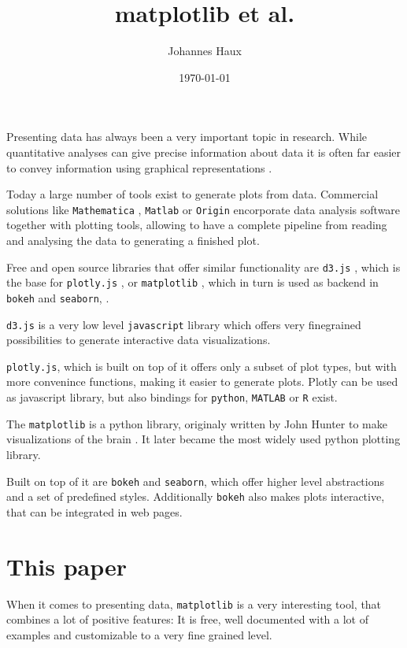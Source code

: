 \documentclass[a4paper, 11pt, onecolumn]{article}
\title{matplotlib et al.}
\author{Johannes Haux}
\date{\today}
\newcommand{\mpl}{\texttt{matplotlib}\xspace}
\newcommand{\pl}[1]{\mbox{\texttt{#1}\xspace}}
\begin{document}
\maketitle


Presenting data has always been a very important topic in research. 
While quantitative analyses can give precise information about data it is
often far easier to convey information using graphical representations 
\cite{plotsarecool}.

Today a large number of tools exist to generate plots from data.  Commercial
solutions like \pl{Mathematica} \cite{mate}, \pl{Matlab} \cite{matl} or
\pl{Origin} \cite{orig} encorporate data analysis software together with
plotting tools, allowing to have a complete pipeline from reading and analysing
the data to generating a finished plot.

Free and open source libraries that offer similar functionality are \pl{d3.js}
\cite{d3js}, which is the base for \pl{plotly.js} \cite{plotly}, or \mpl
\cite{mpl}, which in turn is used as backend in \pl{bokeh} \cite{bokeh} and
\pl{seaborn}, \cite{seaborn}.

\pl{d3.js} is a very low level \pl{javascript} library which offers very
finegrained possibilities to generate interactive data visualizations.

\pl{plotly.js}, which is built on top of it offers only a subset of plot types,
but with more convenince functions, making it easier to generate plots. 
Plotly can be used as javascript library, but also bindings for \pl{python}, 
\pl{MATLAB} or \pl{R} exist.

The \mpl is a python library, originaly written by John Hunter to make 
visualizations of the brain \cite{john}. It later became the most widely used
python plotting library.

Built on top of it are \pl{bokeh} and \pl{seaborn}, which offer higher level
abstractions and a set of predefined styles. Additionally \pl{bokeh} also
makes plots interactive, that can be integrated in web pages.


\section{This paper}

When it comes to presenting data, \mpl is a very interesting
tool, that combines a lot of positive features:
It is 
free,
well documented with a lot of examples and
customizable to a very fine grained level.
\end{document}
